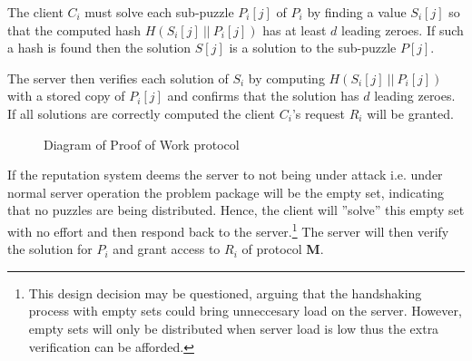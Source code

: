 The client $C_i$ must solve each sub-puzzle $P_i[j]$ of $P_i$ by finding a value $S_i[j]$ so that the computed hash $H(S_i[j] \ || \ P_i[j] )$ has at least $d$ leading zeroes. If such a hash is found then the solution $S[j]$ is a solution to the sub-puzzle $P[j]$.

The server then verifies each solution of $S_i$ by computing $H(S_i[j] \ || \ P_i[j])$ with a stored copy of $P_i[j]$ and confirms that the solution has $d$ leading zeroes. If all solutions are correctly computed the client $C_i$'s request $R_i$ will be granted. 

\begin{figure}[H]
	\begin{center}
		 \vspace{10pt}
		\caption{Diagram of Proof of Work protocol}\label{tab:protocol}
	 \end{center}
\end{figure}
If the reputation system deems the server to not being under attack i.e. under normal server operation the problem package will be the empty set, indicating that no puzzles are being distributed.
Hence, the client will ''solve'' this empty set with no effort and then respond back to the server.\footnote{This design decision may be questioned, arguing that the handshaking process with empty sets could bring unneccesary load on the server.
However, empty sets will only be distributed when server load is low thus the extra verification can be afforded.}
The server will then verify the solution for $P_i$ and grant access to $R_i$ of protocol \textbf{M}.

